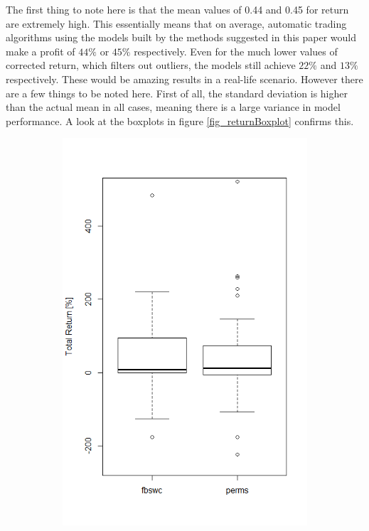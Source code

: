  The first thing to note here is that the mean values of 0.44 and 0.45 for return are extremely high. This essentially means that on average, automatic trading algorithms using the models built by the methods suggested in this paper would make a profit of $44\%$ or $45\%$ respectively. Even for the much lower values of corrected return, which filters out outliers, the models still achieve $22\%$ and $13\%$ respectively. These would be amazing results in a real-life scenario. However there are a few things to be noted here. First of all, the standard deviation is higher than the actual mean in all cases, meaning there is a large variance in model performance. A look at the boxplots in figure \ref{fig_returnBoxplot} confirms this.
 
\begin{figure}[h]
\centering
\begin{subfigure}{.5\textwidth}
  \centering
  \includegraphics[width=\linewidth]{boxplotReturn}

\end{subfigure}
\end{figure}
